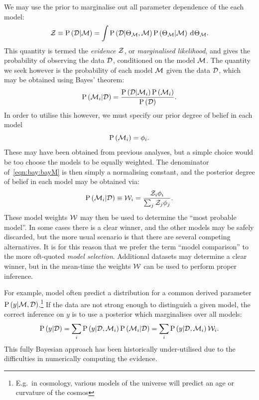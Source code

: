 We may use the prior to marginalise out all parameter dependence of the each model:
\begin{equation}
  \mathcal{Z}\equiv\mathrm{P}\left(\mathcal{D}\middle|\mathcal{M}\right) 
  =
  \int  \mathrm{P}\left(\mathcal{D}\middle|\Theta_{\mathcal{M}},\mathcal{M}\right)\mathrm{P}\left(\Theta_{\mathcal{M}}\middle|\mathcal{M}\right)\:\operatorname{d}^{}\!{\Theta_{\mathcal{M}}}.
  \label{eqn:bay:ev_def}
\end{equation}
This quantity is termed the {\em evidence\/} $\mathcal{Z}$, or {\em marginalised likelihood}, and gives the probability of observing the data $\mathcal{D}$, conditioned on the model $\mathcal{M}$. The quantity we seek however is the probability of each model $\mathcal{M}$ given the data $\mathcal{D}$, which may be obtained using Bayes' theorem:
\begin{equation}
  \mathrm{P}\left(\mathcal{M}_i\middle|\mathcal{D}\right) = \frac{\mathrm{P}\left(\mathcal{D}\middle|\mathcal{M}_i\right)\mathrm{P}\left(\mathcal{M}_i\right)}{\mathrm{P}\left(\mathcal{D}\right)}.
  \label{eqn:bay:bayM}
\end{equation}
In order to utilise this however, we must specify our prior degree of belief in each model
\begin{equation}
  \mathrm{P}\left(\mathcal{M}_i\right) = \phi_i.
\end{equation}
These may have been obtained from previous analyses, but a simple choice would be too choose the models to be equally weighted. The denominator of~\eqref{eqn:bay:bayM} is then simply a normalising constant, and the posterior degree of belief in each model may be obtained via:
\begin{equation}
  \mathrm{P}\left(\mathcal{M}_i\middle|\mathcal{D}\right) 
  \equiv
  \mathcal{W}_i
  =
  \frac{\mathcal{Z}_i\phi_i}{\sum_j \mathcal{Z}_j\phi_j}.
\end{equation}
These model weights $\mathcal{W}$ may then be used to determine the ``most probable model''. In some cases there is a clear winner, and the other models may be safely discarded, but the more usual scenario is that there are several competing alternatives. It is for this reason that we prefer the term ``model comparison'' to the more oft-quoted {\em model selection}. Additional datasets may determine a clear winner, but in the mean-time the weights $\mathcal{W}$ can be used to perform proper inference. 

For example, model often predict a distribution for a common derived parameter $\mathrm{P}\left(y\middle|\mathcal{M},\mathcal{D}\right)$.\footnote{E.g.\ in cosmology, various models of the universe will predict an age or curvature of the cosmos} If the data are not strong enough to distinguish a given model, the correct inference on $y$ is to use a posterior which marginalises over all models:
\begin{equation}
  \mathrm{P}\left(y\middle|\mathcal{D}\right) 
  = \sum_i\mathrm{P}\left(y\middle|\mathcal{D},\mathcal{M}_i\right)\mathrm{P}\left(\mathcal{M}_i\middle|\mathcal{D}\right)
  = \sum_i\mathrm{P}\left(y\middle|\mathcal{D},\mathcal{M}_i\right)\mathcal{W}_i.
\end{equation}
This fully Bayesian approach has been historically under-utilised due to the difficulties in numerically computing the evidence.



